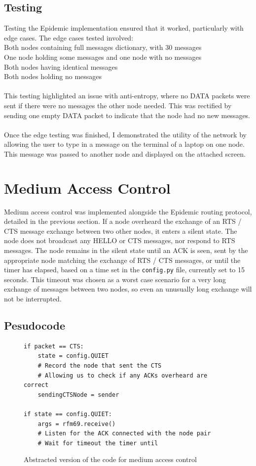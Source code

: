 \documentclass[12pt,a4paper]{report}
\begin{document}
\subsection{Testing}
Testing the Epidemic implementation ensured that it worked, particularly with edge cases. The edge cases tested involved: \\
Both nodes containing full messages dictionary, with 30 messages \\
One node holding some messages and one node with no messages \\
Both nodes having identical messages \\
Both nodes holding no messages \\ \\
This testing highlighted an issue with anti-entropy, where no DATA packets were sent if there were no messages the other node needed. This was rectified by sending one empty DATA packet to indicate that the node had no new messages. \\ \\
Once the edge testing was finished, I demonstrated the utility of the network by allowing the user to type in a message on the terminal of a laptop on one node. This message was passed to another node and displayed on the attached screen. \\

\section{Medium Access Control}
Medium access control was implemented alongside the Epidemic routing protocol, detailed in the previous section. If a node overheard the exchange of an RTS / CTS message exchange between two other nodes, it enters a silent state. The node does not broadcast any HELLO or CTS messages, nor respond to RTS messages. The node remains in the silent state until an ACK is seen, sent by the appropriate node matching the exchange of RTS / CTS messages, or until the timer has elapsed, based on a time set in the \verb'config.py' file, currently set to 15 seconds. This timeout was chosen as a worst case scenario for a very long exchange of messages between two nodes, so even an unusually long exchange will not be interrupted. 

\subsection{Pesudocode}
\begin{figure}[h]
\begin{verbatim}
if packet == CTS:
    state = config.QUIET
    # Record the node that sent the CTS 
    # Allowing us to check if any ACKs overheard are correct 
    sendingCTSNode = sender

if state == config.QUIET:
    args = rfm69.receive()
    # Listen for the ACK connected with the node pair
    # Wait for timeout the timer until 
\end{verbatim}
\caption{Abstracted version of the code for medium access control}
\end{figure}
\end{document}
